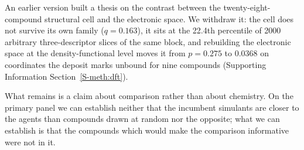 \documentclass[journal=ancham,manuscript=article,margin=1in]{achemso}
\begin{document}
An earlier version built a thesis on the contrast between the
twenty-eight-compound structural cell and the electronic space. We withdraw it:
the cell does not survive its own family ($q = 0.163$), it sits at the 22.4th
percentile of 2000 arbitrary three-descriptor slices of the same block, and
rebuilding the electronic space at the density-functional level moves it from
$p=0.275$ to 0.0368 on coordinates the deposit marks unbound for nine
compounds (Supporting Information Section~\ref{S-meth:dft}).

What remains is a claim about comparison rather than about chemistry. On the
primary panel we can establish neither that the incumbent simulants are closer
to the agents than compounds drawn at random nor the opposite; what we can
establish is that the compounds which would make the comparison informative were
not in it.
\end{document}
